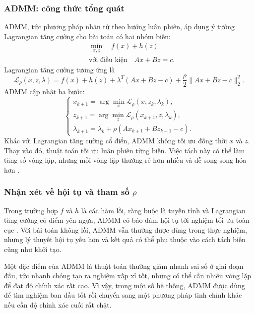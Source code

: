 \subsubsection*{ADMM: công thức tổng quát}
ADMM, tức phương pháp nhân tử theo hướng luân phiên, áp dụng ý tưởng Lagrangian tăng cường cho bài toán có hai nhóm biến:
\begin{equation}
    \begin{aligned}
        &\min_{x,z}\quad f(x)+h(z)\\
        &\text{với điều kiện}\quad Ax+Bz=c.
    \end{aligned}
    \label{eq_admm_problem}
\end{equation}
Lagrangian tăng cường tương ứng là
\begin{equation}
    \mathcal{L}_{\rho}(x,z,\lambda)
    =
    f(x)+h(z)
    +\lambda^{T}(Ax+Bz-c)
    +\frac{\rho}{2}\|Ax+Bz-c\|_2^2.
    \label{eq_admm_aug_lag}
\end{equation}
ADMM cập nhật ba bước:
\begin{equation}
    \begin{cases}
        x_{k+1}
        =
        \arg\min_x \mathcal{L}_{\rho}(x,z_k,\lambda_k),\\
        z_{k+1}
        =
        \arg\min_z \mathcal{L}_{\rho}(x_{k+1},z,\lambda_k),\\
        \lambda_{k+1}
        =
        \lambda_k+\rho(Ax_{k+1}+Bz_{k+1}-c).
    \end{cases}
    \label{eq_admm_steps}
\end{equation}
Khác với Lagrangian tăng cường cổ điển, ADMM không tối ưu đồng thời $x$ và $z$. Thay vào đó, thuật toán tối ưu luân phiên từng biến. Việc tách này có thể làm tăng số vòng lặp, nhưng mỗi vòng lặp thường rẻ hơn nhiều và dễ song song hóa hơn \cite{Boyd2011ADMM}.

\subsubsection*{Nhận xét về hội tụ và tham số $\rho$}
Trong trường hợp $f$ và $h$ là các hàm lồi, ràng buộc là tuyến tính và Lagrangian tăng cường có điểm yên ngựa, ADMM có bảo đảm hội tụ tới nghiệm tối ưu toàn cục \cite{Boyd2011ADMM}. Với bài toán không lồi, ADMM vẫn thường được dùng trong thực nghiệm, nhưng lý thuyết hội tụ yếu hơn và kết quả có thể phụ thuộc vào cách tách biến cũng như khởi tạo.
\medskip

Một đặc điểm của ADMM là thuật toán thường giảm nhanh sai số ở giai đoạn đầu, tức nhanh chóng tạo ra nghiệm xấp xỉ tốt, nhưng có thể cần nhiều vòng lặp để đạt độ chính xác rất cao. Vì vậy, trong một số hệ thống, ADMM được dùng để tìm nghiệm ban đầu tốt rồi chuyển sang một phương pháp tinh chỉnh khác nếu cần độ chính xác cuối rất chặt.
\medskip

